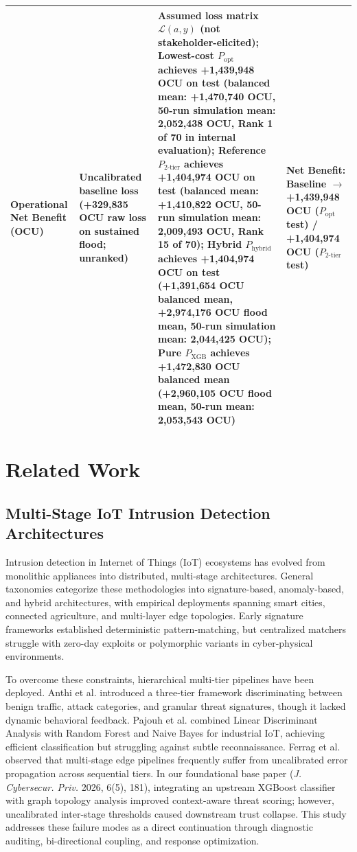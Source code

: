 \documentclass[journal,10pt,onecolumn]{IEEEtran}
\begin{document}
\begin{table}[t]
\begin{tabular}{p{3.2cm}p{5.5cm}p{5.5cm}p{2.0cm}}
Operational Net Benefit (OCU) & Uncalibrated baseline loss (+329,835 OCU raw loss on sustained flood; unranked) & Assumed loss matrix $\mathcal{L}(a, y)$ (not stakeholder-elicited); Lowest-cost $P_{\text{opt}}$ achieves +1,439,948 OCU on test (balanced mean: +1,470,740 OCU, 50-run simulation mean: 2,052,438 OCU, Rank 1 of 70 in internal evaluation); Reference $P_{2\text{-tier}}$ achieves +1,404,974 OCU on test (balanced mean: +1,410,822 OCU, 50-run simulation mean: 2,009,493 OCU, Rank 15 of 70); Hybrid $P_{\text{hybrid}}$ achieves +1,404,974 OCU on test (+1,391,654 OCU balanced mean, +2,974,176 OCU flood mean, 50-run simulation mean: 2,044,425 OCU); Pure $P_{\text{XGB}}$ achieves +1,472,830 OCU balanced mean (+2,960,105 OCU flood mean, 50-run mean: 2,053,543 OCU) & Net Benefit: Baseline $\to$ +1,439,948 OCU ($P_{\text{opt}}$ test) / +1,404,974 OCU ($P_{2\text{-tier}}$ test) \\
\bottomrule
\end{tabular}
\end{table}

\section{Related Work}

\subsection{Multi-Stage IoT Intrusion Detection Architectures}
Intrusion detection in Internet of Things (IoT) ecosystems has evolved from monolithic appliances into distributed, multi-stage architectures. General taxonomies categorize these methodologies into signature-based, anomaly-based, and hybrid architectures, with empirical deployments spanning smart cities, connected agriculture, and multi-layer edge topologies. Early signature frameworks established deterministic pattern-matching, but centralized matchers struggle with zero-day exploits or polymorphic variants in cyber-physical environments.

To overcome these constraints, hierarchical multi-tier pipelines have been deployed. Anthi et al. introduced a three-tier framework discriminating between benign traffic, attack categories, and granular threat signatures, though it lacked dynamic behavioral feedback. Pajouh et al. combined Linear Discriminant Analysis with Random Forest and Naive Bayes for industrial IoT, achieving efficient classification but struggling against subtle reconnaissance. Ferrag et al. observed that multi-stage edge pipelines frequently suffer from uncalibrated error propagation across sequential tiers. In our foundational base paper \cite{1} (\textit{J. Cybersecur. Priv.} 2026, 6(5), 181), integrating an upstream XGBoost classifier with graph topology analysis improved context-aware threat scoring; however, uncalibrated inter-stage thresholds caused downstream trust collapse. This study addresses these failure modes as a direct continuation through diagnostic auditing, bi-directional coupling, and response optimization.
\end{document}
